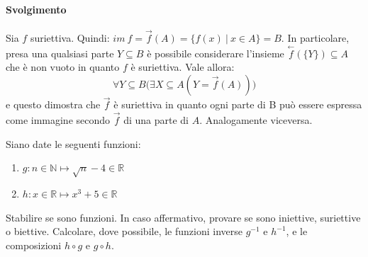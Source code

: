 \paragraph*{Svolgimento} Sia $f$ suriettiva. Quindi: $im \ f = \stackrel{\rightarrow}{f}(A)=\{f(x) \ | \ x \in A \} = B$. In particolare, presa una qualsiasi parte $Y \subseteq B$ è possibile considerare l'insieme $\stackrel{\leftarrow}{f}(\{Y\}) \subseteq A$ che è non vuoto in quanto $f$ è suriettiva. Vale allora:
\begin{displaymath}
	\forall Y \subseteq B \bigl( \exists X \subseteq A (Y = \stackrel{\rightarrow}{f}(A))\bigr)
\end{displaymath}
e questo dimostra che $\stackrel{\rightarrow}{f}$ è suriettiva in quanto ogni parte di B può essere espressa come immagine secondo $\stackrel{\rightarrow}{f}$ di una parte di $A$. Analogamente viceversa. \hfill \blacksquare
\begin{exsbox}
	Siano date le seguenti funzioni:
	\begin{enumerate}
		\item $g: n \in \mathbb{N} \mapsto \sqrt{n}-4 \in \mathbb{R}$
		\item $h: x \in \mathbb{R} \mapsto x^{3}+5 \in \mathbb{R}$
	\end{enumerate}
	Stabilire se sono funzioni. In caso affermativo, provare se sono iniettive, suriettive o biettive. Calcolare, dove possibile, le funzioni inverse $g^{-1}$ e $h^{-1}$, e le composizioni $h \circ g$ e $g \circ h$.
\end{exsbox}
